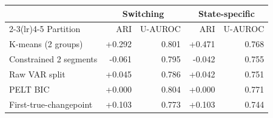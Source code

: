 \begin{tabular}{lrrrr}
\toprule
& \multicolumn{2}{c}{Switching} & \multicolumn{2}{c}{State-specific} \\
\cmidrule(lr){2-3}\cmidrule(lr){4-5}
Partition & ARI & U-AUROC & ARI & U-AUROC \\
\midrule
K-means (2 groups) & +0.292 & 0.801 & +0.471 & 0.768 \\
Constrained 2 segments & -0.061 & 0.795 & -0.042 & 0.755 \\
Raw VAR split & +0.045 & 0.786 & +0.042 & 0.751 \\
PELT BIC & +0.000 & 0.804 & +0.000 & 0.771 \\
First-true-changepoint & +0.103 & 0.773 & +0.103 & 0.744 \\
\bottomrule
\end{tabular}
